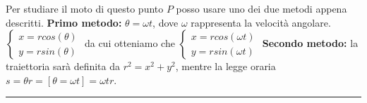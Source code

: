 Per studiare il moto di questo punto $P$ posso usare uno dei due metodi appena descritti.\newline
\textbf{Primo metodo:}\newline
$\theta = \omega t$, dove $\omega$ rappresenta la velocità angolare.\newline
$\begin{cases}
    x = r cos(\theta)\\
    y = r sin(\theta)
\end{cases}$
da cui otteniamo che $\begin{cases}
    x = r cos(\omega t)\\
    y = r sin(\omega t)
\end{cases}$ 
\newline
\textbf{Secondo metodo:}\newline
la traiettoria sarà definita da $r^2 = x^2 + y^2$, mentre la legge oraria $s = \theta r = [\theta = \omega t] = \omega t r$.
\rule{\textwidth}{0,4pt}
